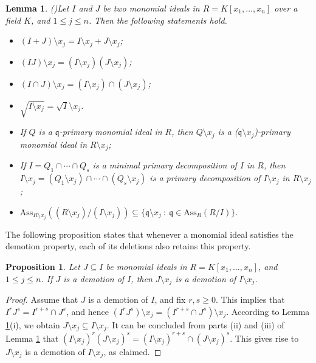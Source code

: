 \documentclass[11pt]{amsart}
\newtheorem{lemma}[theorem]{Lemma}
\newtheorem{proposition}[theorem]{Proposition}
\begin{document}
\begin{lemma}(\cite[Lemma 4.12]{RNA})\label{LEM.Deletion}
Let $I$ and $J$ be two monomial ideals   in  $R=K[x_1,\ldots, x_n]$ over a field $K$,  and $1\leq j \leq n$. Then the following statements hold.
\begin {itemize}
\item[(i)] $(I+J)\setminus x_j= I\setminus x_j + J\setminus x_j$;
\item[(ii)] $(IJ)\setminus x_j= (I\setminus x_j)  (J\setminus x_j)$;
\item[(iii)] $(I\cap J)\setminus x_j= (I\setminus x_j) \cap  (J\setminus x_j)$; 
\item[(iv)]  $\sqrt{I\setminus x_j}=\sqrt{I}\setminus x_j$.
\item[(v)] If $Q$ is a $\mathfrak{q}$-primary monomial ideal in $R$, then $Q\setminus x_j$ is a ($\mathfrak{q}\setminus x_j$)-primary monomial ideal in $R\setminus x_j$;
\item[(vi)] If $I=Q_1\cap \cdots \cap Q_s$ is a minimal primary decomposition of $I$ in $R$, then  $I\setminus x_j=(Q_1\setminus x_j)\cap \cdots \cap (Q_s\setminus x_j)$ is a  primary decomposition of $I\setminus x_j$ in $R\setminus x_j$;
\item[(vii)] $\mathrm{Ass}_{R\setminus x_j}((R \setminus x_j)/(I\setminus x_j))\subseteq \{\mathfrak{q}\setminus x_j~:~ \mathfrak{q}\in \mathrm{Ass}_{R}(R/I) \}$.
\end{itemize}
 \end{lemma}


The following proposition states that whenever a monomial ideal satisfies the demotion property, each of its deletions also retains this property. 

\begin{proposition}\label{PRO.Deletion}
Let  $J \subseteq I$ be monomial ideals in  $R=K[x_1, \ldots, x_n]$, and  $1\leq j \leq n$.  If  $J$ is a demotion of $I$, then  $J\setminus x_j$ 
is a demotion of   $I\setminus x_j$. 
\end{proposition}
\begin{proof}
Assume that $J$ is a demotion of $I$,   and fix $r,s\geq 0$. This implies that  $I^rJ^s=I^{r+s} \cap J^s$, and hence
  $(I^rJ^s)\setminus x_j=(I^{r+s} \cap J^s)\setminus x_j$. According to  Lemma \ref{LEM.Deletion}(i), we obtain  $J\setminus x_j \subseteq I\setminus x_j$. 
   It can be concluded  from parts (ii) and (iii) of  Lemma \ref{LEM.Deletion} that  
   $(I\setminus x_j)^r (J\setminus x_j)^s=(I\setminus x_j)^{r+s} \cap (J\setminus x_j)^s$. This gives rise to $J\setminus x_j$ 
is a demotion of   $I\setminus x_j$, as claimed. 
 \end{proof}
\end{document}
